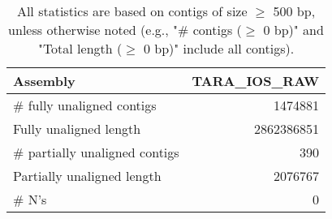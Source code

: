 \documentclass[12pt,a4paper]{article}
\begin{document}
\begin{table}[ht]
\begin{center}
\caption{All statistics are based on contigs of size $\geq$ 500 bp, unless otherwise noted (e.g., "\# contigs ($\geq$ 0 bp)" and "Total length ($\geq$ 0 bp)" include all contigs).}
\begin{tabular}{|l*{1}{|r}|}
\hline
Assembly & TARA\_IOS\_RAW \\ \hline
\# fully unaligned contigs & 1474881 \\ \hline
Fully unaligned length & 2862386851 \\ \hline
\# partially unaligned contigs & 390 \\ \hline
Partially unaligned length & 2076767 \\ \hline
\# N's & 0 \\ \hline
\end{tabular}
\end{center}
\end{table}
\end{document}
